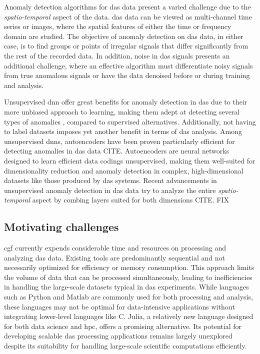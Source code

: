 
Anomaly detection algorithms for \acrshort{das} data present a varied challenge due to the \textit{spatio-temporal} aspect of the data. \acrshort{das} data can be viewed as multi-channel time series or images, where the spatial features of either the time or frequency domain are studied. The objective of anomaly detection on \acrshort{das} data, in either case, is to find groups or points of irregular signals that differ significantly from the rest of the recorded data. In addition, noise in \acrshort{das} signals presents an additional challenge, where an effective algorithm must differentiate noisy signals from true anomalous signals or have the data denoised before or during training and analysis.

Unsupervised \acrfull{dnn} offer great benefits for anomaly detection in \acrshort{das} due to their more unbiased approach to learning, making them adept at detecting several types of anomalies \cite{wei2022lstmautoencoder, srivastava2016unsupervised}, compared to supervised alternatives. Additionally, not having to label datasets imposes yet another benefit in terms of \acrshort{das} analysis. Among unsupervised \acrshort{dnn}s, autoencoders have been proven particularly efficient for detecting anomalies in \acrshort{das} data CITE. Autoencoders are neural networks designed to learn efficient data codings unsupervised, making them well-suited for dimensionality reduction and anomaly detection in complex, high-dimensional datasets like those produced by \acrshort{das} systems. Recent advancements in unsupervised anomaly detection in \acrshort{das} data try to analyze the entire \textit{spatio-temporal} aspect by combing layers suited for both dimensions CITE. FIX

\subsection{Motivating challenges}

\acrshort{cgf} currently expends considerable time and resources on processing and analyzing \acrshort{das} data. Existing tools are predominantly sequential and not necessarily optimized for efficiency or memory consumption. This approach limits the volume of data that can be processed simultaneously, leading to inefficiencies in handling the large-scale datasets typical in \acrshort{das} experiments. 
While languages such as Python and Matlab are commonly used for both processing and analysis, these languages may not be optimal for data-intensive applications without integrating lower-level languages like C. Julia, a relatively new language designed for both data science and \acrfull{hpc}, offers a promising alternative. Its potential for developing scalable \acrshort{das} processing applications remains largely unexplored despite its suitability for handling large-scale scientific computations efficiently. 

